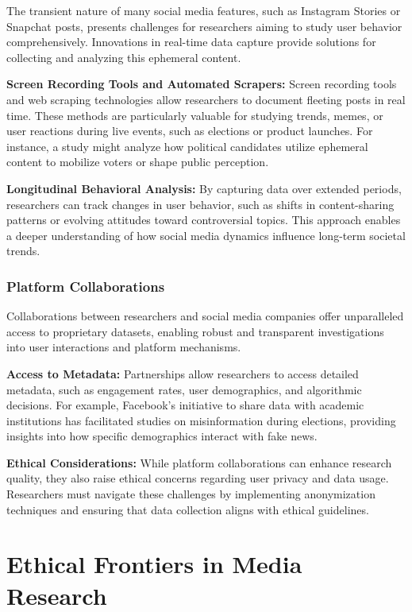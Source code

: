 \documentclass[
]{book}
\begin{document}
The transient nature of many social media features, such as Instagram Stories or Snapchat posts, presents challenges for researchers aiming to study user behavior comprehensively. Innovations in real-time data capture provide solutions for collecting and analyzing this ephemeral content.

\textbf{Screen Recording Tools and Automated Scrapers:} Screen recording tools and web scraping technologies allow researchers to document fleeting posts in real time. These methods are particularly valuable for studying trends, memes, or user reactions during live events, such as elections or product launches. For instance, a study might analyze how political candidates utilize ephemeral content to mobilize voters or shape public perception.

\textbf{Longitudinal Behavioral Analysis:} By capturing data over extended periods, researchers can track changes in user behavior, such as shifts in content-sharing patterns or evolving attitudes toward controversial topics. This approach enables a deeper understanding of how social media dynamics influence long-term societal trends.

\subsubsection{Platform Collaborations}\label{platform-collaborations}

Collaborations between researchers and social media companies offer unparalleled access to proprietary datasets, enabling robust and transparent investigations into user interactions and platform mechanisms.

\textbf{Access to Metadata:} Partnerships allow researchers to access detailed metadata, such as engagement rates, user demographics, and algorithmic decisions. For example, Facebook's initiative to share data with academic institutions has facilitated studies on misinformation during elections, providing insights into how specific demographics interact with fake news.

\textbf{Ethical Considerations:} While platform collaborations can enhance research quality, they also raise ethical concerns regarding user privacy and data usage. Researchers must navigate these challenges by implementing anonymization techniques and ensuring that data collection aligns with ethical guidelines.

\section{Ethical Frontiers in Media Research}\label{ethical-frontiers-in-media-research}
\end{document}
